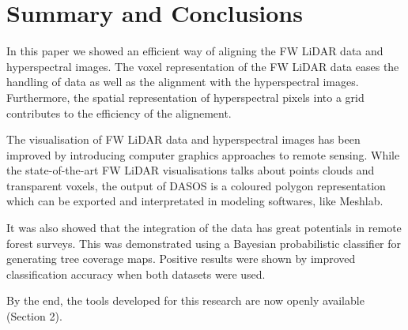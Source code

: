 \documentclass{subfiles}
\begin{document}
\newpage\newpage
\section {Summary and Conclusions}
\par In this paper we showed an efficient way of aligning the FW LiDAR data and hyperspectral images. The voxel representation of the FW LiDAR data eases the handling of data as well as the alignment with the hyperspectral images. Furthermore, the spatial representation of hyperspectral pixels into a grid
contributes to the efficiency of the alignement.

\par The visualisation of FW LiDAR data and hyperspectral images has been improved by introducing computer graphics approaches to remote sensing. While the state-of-the-art FW LiDAR visualisations talks about points clouds and transparent
voxels, the output of DASOS is a coloured polygon representation which can be exported and interpretated in modeling softwares, like Meshlab.

\par It was also showed that the integration of the data has great potentials in remote forest surveys. This was demonstrated using a Bayesian probabilistic classifier for generating tree coverage maps. Positive results were shown by improved classification accuracy when both datasets were used.

\par By the end, the tools developed for this research are now openly available (Section 2). 
\end{document}

